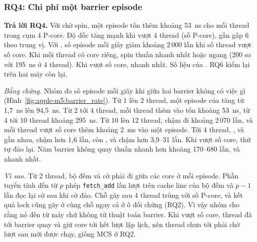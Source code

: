 \subsubsection{RQ4: Chi phí một barrier episode}

\begin{rqanswer}\textbf{Trả lời RQ4.} Với chờ spin, một episode tốn thêm khoảng 53~ns cho mỗi thread
trong cụm 4 P-core. Độ dốc tăng mạnh khi vượt 4 thread (số P-core), gần gấp 6 theo trung vị. Với , số episode
mỗi giây giảm khoảng 2\,000 lần khi số thread vượt số core. Khi mỗi thread có core riêng, spin thuần
nhanh nhất hoặc ngang  (200 so với 195~ns ở 4 thread). Khi vượt số core,
 nhanh nhất. Số liệu của . RQ6 kiểm lại trên hai máy còn
lại.\end{rqanswer}


\emph{Bằng chứng.} Nhóm đo số episode mỗi giây khi giữa hai barrier không có việc gì
(Hình~\ref{fig:apple-m5:barrier_rate}). Từ 1 lên 2 thread, một episode của  tăng từ 1,7~ns
lên 94,5~ns. Từ 2 tới 4 thread, mỗi thread thêm vào tốn khoảng 53~ns, từ 4 tới 10 thread khoảng 295~ns.
Từ 10 lên 12 thread,  chậm đi khoảng 2\,070 lần, và mỗi thread vượt số core thêm khoảng 2~ms
vào một episode. Tới 4 thread, ,  và  gần nhau,
 chậm hơn  1,6 lần, còn ,  và
 chậm hơn 3,9--31 lần. Khi vượt số core, thứ tự đảo lại. Năm barrier không quay
thuần nhanh hơn  khoảng 170--680 lần, và  nhanh nhất.

\emph{Vì sao.} Từ 2 thread, bộ đếm và cờ phải đi giữa các core ở mỗi episode. Phần tuyến tính đến từ
$p$ phép \texttt{fetch\_add} lần lượt trên cache line của bộ đếm và $p-1$ lần đọc lại cờ sau khi cờ đảo.
Chỗ gãy sau 4 thread trùng với số P-core, và kết quả lock cũng gãy ở cùng chỗ ngay cả ở ô đối chứng
(RQ2). Vì vậy nhóm cho rằng nó đến từ máy chứ không từ thuật toán barrier. Khi vượt số core, thread đã tới
barrier quay và giữ core tới hết lượt lập lịch, nên thread chưa tới phải chờ lượt sau mới được chạy, giống
MCS ở RQ2.

